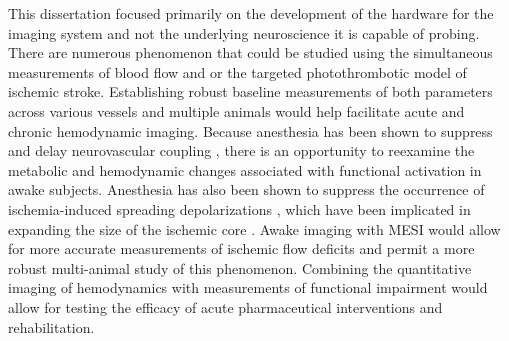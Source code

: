This dissertation focused primarily on the development of the hardware for the imaging system and not the underlying neuroscience it is capable of probing. There are numerous phenomenon that could be studied using the simultaneous measurements of blood flow and  or the targeted photothrombotic model of ischemic stroke. Establishing robust baseline measurements of both parameters across various vessels and multiple animals would help facilitate acute and chronic hemodynamic imaging. Because anesthesia has been shown to suppress and delay neurovascular coupling \cite{Pisauro:2013cx}, there is an opportunity to reexamine the metabolic and hemodynamic changes associated with functional activation \cite{Dunn:2005gw} in awake subjects. Anesthesia has also been shown to suppress the occurrence of ischemia-induced spreading depolarizations \cite{Kudo:2016ho}, which have been implicated in expanding the size of the ischemic core \cite{Shin:2006dc}. Awake imaging with MESI would allow for more accurate measurements of ischemic flow deficits and permit a more robust multi-animal study of this phenomenon. Combining the quantitative imaging of hemodynamics with measurements of functional impairment would allow for testing the efficacy of acute pharmaceutical interventions and rehabilitation.



